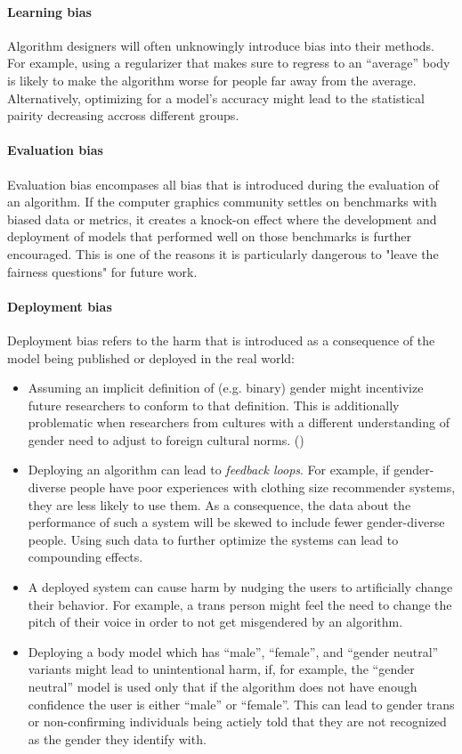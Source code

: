 \documentclass[sigconf,review,balance=false]{acmart}
\begin{document}
\paragraph*{Learning bias} Algorithm designers will often unknowingly introduce bias into their methods. For example, using a regularizer that makes sure to regress to an ``average'' body is likely to make the algorithm worse for people far away from the average. Alternatively, optimizing for a model's accuracy might lead to the statistical pairity decreasing accross different groups.

\paragraph*{Evaluation bias} Evaluation bias encompases all bias that is introduced during the evaluation of an algorithm. If the computer graphics community settles on benchmarks with biased data or metrics, it creates a knock-on effect where the development and deployment of models that performed well on those benchmarks is further encouraged. This is one of the reasons it is particularly dangerous to "leave the fairness questions" for future work.

\paragraph*{Deployment bias} Deployment bias refers to the harm that is introduced as a consequence of the model being published or deployed in the real world:
\begin{itemize}
    \item Assuming an implicit definition of (e.g. binary) gender might incentivize future researchers to conform to that definition. This is additionally problematic when researchers from cultures with a different understanding of gender need to adjust to foreign cultural norms. ()
    \item Deploying an algorithm can lead to \emph{feedback loops}. For example, if gender-diverse people have poor experiences with clothing size recommender systems, they are less likely to use them. As a consequence, the data about the performance of such a system will be skewed to include fewer gender-diverse people. Using such data to further optimize the systems can lead to compounding effects.
    \item A deployed system can cause harm by nudging the users to artificially change their behavior. For example, a trans person might feel the need to change the pitch of their voice in order to not get misgendered by an algorithm.
    \item Deploying a body model which has ``male'', ``female'', and ``gender neutral'' variants might lead to unintentional harm, if, for example, the ``gender neutral'' model is used only that if the algorithm does not have enough confidence the user is either ``male'' or ``female''. This can lead to gender trans or non-confirming individuals being actiely told that they are not recognized as the gender they identify with.
\end{itemize}
\end{document}
